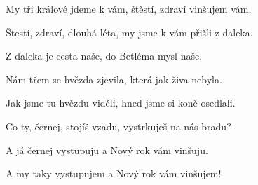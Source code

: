 \vskip-5mm
\IncludeLilypond

My tři králové jdeme k vám,
štěstí, zdraví vinšujem vám.

Štestí, zdraví, dlouhá léta,
my jsme k vám přišli z daleka.

Z daleka je cesta naše,
do Betléma mysl naše.

Nám třem se hvězda zjevila,
která jak živa nebyla.

Jak jsme tu hvězdu viděli,
hned jsme si koně osedlali.

Co ty, černej, stojíš vzadu,
vystrkuješ na nás bradu?

A já černej vystupuju
a Nový rok vám vinšuju.

A my taky vystupujem
a Nový rok vám vinšujem!

